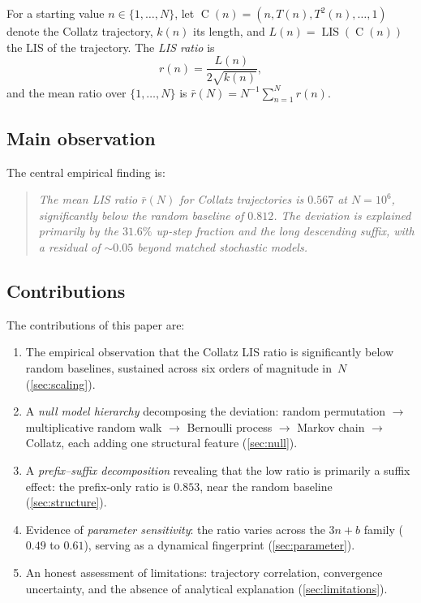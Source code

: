 \documentclass[11pt]{article}
\theoremstyle{definition}
\theoremstyle{remark}
\newcommand{\LIS}{\operatorname{LIS}}
\newcommand{\Coll}{\operatorname{C}}
\begin{document}
For a starting value $n \in \{1, \ldots, N\}$, let
$\Coll(n) = (n, T(n), T^2(n), \ldots, 1)$ denote the Collatz trajectory,
$k(n)$ its length, and $L(n) = \LIS(\Coll(n))$ the LIS of the trajectory.
The \emph{LIS ratio} is
\begin{equation}\label{eq:ratio}
  r(n) = \frac{L(n)}{2\sqrt{k(n)}},
\end{equation}
and the mean ratio over $\{1, \ldots, N\}$ is $\bar{r}(N) = N^{-1}
\sum_{n=1}^{N} r(n)$.

\subsection{Main observation}

The central empirical finding is:

\begin{quote}
\emph{The mean LIS ratio $\bar{r}(N)$ for Collatz trajectories is
$0.567$ at $N = 10^6$, significantly below the random baseline of
$0.812$. The deviation is explained primarily by the $31.6\%$ up-step
fraction and the long descending suffix, with a residual of $\sim 0.05$
beyond matched stochastic models.}
\end{quote}

\subsection{Contributions}

The contributions of this paper are:
\begin{enumerate}
  \item The empirical observation that the Collatz LIS ratio is
    significantly below random baselines, sustained across six orders of
    magnitude in~$N$ (\cref{sec:scaling}).
  \item A \emph{null model hierarchy} decomposing the deviation: random
    permutation $\to$ multiplicative random walk $\to$ Bernoulli process
    $\to$ Markov chain $\to$ Collatz, each adding one structural feature
    (\cref{sec:null}).
  \item A \emph{prefix--suffix decomposition} revealing that the low ratio
    is primarily a suffix effect: the prefix-only ratio is $0.853$, near the
    random baseline (\cref{sec:structure}).
  \item Evidence of \emph{parameter sensitivity}: the ratio varies across
    the $3n+b$ family ($0.49$ to $0.61$), serving as a dynamical
    fingerprint (\cref{sec:parameter}).
  \item An honest assessment of limitations: trajectory correlation,
    convergence uncertainty, and the absence of analytical explanation
    (\cref{sec:limitations}).
\end{enumerate}
\end{document}
